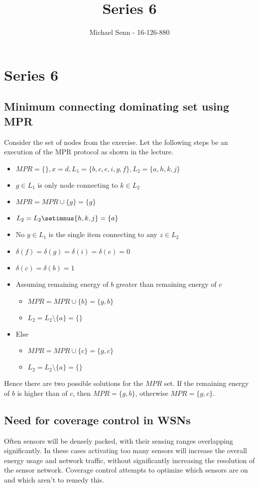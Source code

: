 \documentclass[a4paper]{scrreprt}
\title{Series 6}
\author{Michael Senn \maillink{michael.senn@students.unibe.ch} - 16-126-880}
\date{\printdate}
\begin{document}
\maketitle


\setcounter{chapter}{5}

\chapter{Series 6}

\section{Minimum connecting dominating set using MPR}

Consider the set of nodes from the exercise. Let the following steps be an
execution of the MPR protocol as shown in the lecture.

\begin{itemize}
		\item $MPR = \{\}, x = d, L_1 = \{b, c, e, i, g, f\}, L_2 = \{a, h, k, j\}$
		\item $g \in L_1$ is only node connecting to $k \in L_2$
		\item $MPR = MPR \cup \{g\} = \{g\}$
		\item $L_2 = L_2 \setimnus \{h, k, j\} = \{a\}$
		\item No $y \in L_1$ is the single item connecting to any $z \in L_2$
		\item $\delta(f) = \delta(g) = \delta(i) = \delta(e) = 0$
	  	\item $\delta(c) = \delta(b) = 1$
		\item Assuming remaining energy of $b$ greater than remaining energy of $c$
				\begin{itemize}
						\item $MPR = MPR \cup \{b\} = \{g, b\}$
						\item $L_2 = L_2 \setminus \{a\} = \{\}$
				\end{itemize}
		\item Else
				\begin{itemize}
						\item $MPR = MPR \cup \{c\} = \{g, c\}$
						\item $L_2 = L_2 \setminus \{a\} = \{\}$
				\end{itemize}
\end{itemize}

Hence there are two possible solutions for the $MPR$ set. If the remaining
energy of $b$ is higher than of $c$, then $MPR = \{g, b\}$, otherwise $MPR =
\{g, c\}$.

\section{Need for coverage control in WSNs}

Often sensors will be densely packed, with their sensing ranges overlapping
significantly. In these cases activating too many sensors will increase the
overall energy usage and network traffic, without significantly increasing the
resolution of the sensor network. Coverage control attempts to optimize which
sensors are on and which aren't to remedy this.
\end{document}

